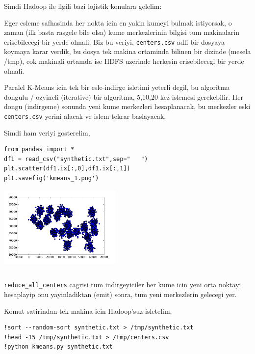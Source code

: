\documentclass[12pt,fleqn]{article}\usepackage{../common}
\begin{document}
Simdi Hadoop ile ilgili bazi lojistik konulara gelelim:

Eger esleme safhasinda her nokta icin en yakin kumeyi bulmak
istiyorsak, o zaman (ilk basta rasgele bile olsa) kume merkezlerinin
bilgisi tum makinalarin erisebilecegi bir yerde olmali. Biz bu veriyi,
\verb!centers.csv! adli bir dosyaya koymaya karar verdik, bu dosya
tek makina ortaminda bilinen bir dizinde (mesela /tmp), cok makinali ortamda
ise HDFS uzerinde herkesin erisebilecegi bir yerde olmali. 

Paralel K-Means icin tek bir esle-indirge isletimi yeterli degil, bu
algoritma dongulu / ozyineli (iterative) bir algoritma, 5,10,20 kez
islemesi gerekebilir.  Her dongu (indirgeme) sonunda yeni kume
merkezleri hesaplanacak, bu merkezler eski \verb!centers.csv!
yerini alacak ve islem tekrar baslayacak.

Simdi ham veriyi gosterelim,

\begin{verbatim}
from pandas import *
df1 = read_csv("synthetic.txt",sep="   ")
plt.scatter(df1.ix[:,0],df1.ix[:,1])
plt.savefig('kmeans_1.png')
\end{verbatim}

\includegraphics[height=4cm]{kmeans_1.png}

\inputminted[fontsize=\footnotesize]{python}{kmeans.py}

\verb!reduce_all_centers! cagrisi tum indirgeyiciler her kume icin yeni
orta noktayi hesaplayip onu yayinladiktan (emit) sonra, tum yeni
merkezlerin gelecegi yer.

Komut satirindan tek makina icin Hadoop'suz isletelim,

\begin{verbatim}
!sort --random-sort synthetic.txt > /tmp/synthetic.txt
!head -15 /tmp/synthetic.txt > /tmp/centers.csv
!python kmeans.py synthetic.txt
\end{verbatim}
\end{document}
